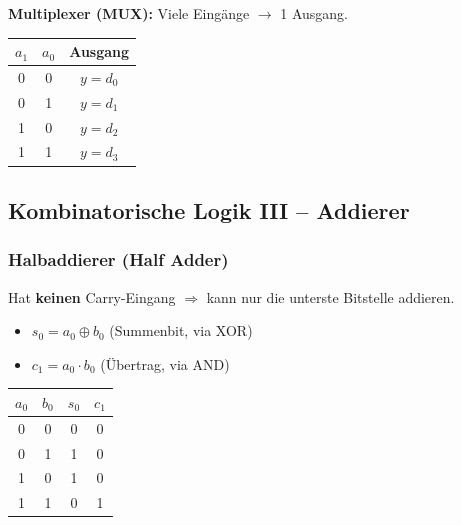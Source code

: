 \documentclass[11pt,a4paper]{article}
\begin{document}
\textbf{Multiplexer (MUX):} Viele Eingänge $\to$ 1 Ausgang.

\begin{center}
\begin{tabular}{cc|c}
    \toprule
    $a_1$ & $a_0$ & Ausgang \\ \midrule
    0 & 0 & $y = d_0$ \\
    0 & 1 & $y = d_1$ \\
    1 & 0 & $y = d_2$ \\
    1 & 1 & $y = d_3$ \\ \bottomrule
\end{tabular}
\end{center}

\subsection{Kombinatorische Logik III -- Addierer}
\subsubsection{Halbaddierer (Half Adder)}
Hat \textbf{keinen} Carry-Eingang $\Rightarrow$ kann nur die unterste Bitstelle addieren.
\begin{itemize}
    \item $s_0 = a_0 \oplus b_0$ (Summenbit, via XOR)
    \item $c_1 = a_0 \cdot b_0$ (Übertrag, via AND)
\end{itemize}
\begin{center}
\begin{tabular}{cc|cc}
    \toprule
    $a_0$ & $b_0$ & $s_0$ & $c_1$ \\ \midrule
    0 & 0 & 0 & 0 \\
    0 & 1 & 1 & 0 \\
    1 & 0 & 1 & 0 \\
    1 & 1 & 0 & 1 \\ \bottomrule
\end{tabular}
\end{center}
\end{document}
